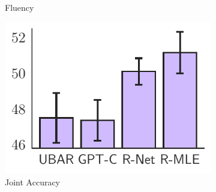 \begin{figure}[tb]
\begin{minipage}{0.49\textwidth}
\begin{subfigure}[b]{0.48\textwidth}
         \vspace{-6mm}
         \caption{Fluency}
         \label{fig:fluency}
     \end{subfigure}
     \vspace{-3mm}
     \captionsetup{font=small}
        \caption{ 
        \footnotesize{Bar plots for the results of human evaluation on appropriateness and fluency, showing the mean and one standard deviation of each method. 
        The scores are on a $5$ scale and higher scores indicate better results.
        ``GPT-C" denotes GPT-Critic.
        Details for the setup of human evaluation are discussed in .}
        }
        \label{fig:human_eval}
    \end{minipage}
    \hfill
    \begin{minipage}{0.49\textwidth}
        \centering
     \begin{subfigure}[b]{0.48\textwidth}
         \centering
         \includegraphics[width=\textwidth]{./Tex/fig/joint_acc_bar.pdf}
         \captionsetup{font=small}
         \vspace{-6mm}
         \caption{Joint Accuracy}
         \label{fig:dst_joint_acc}
     \end{subfigure}
     \hfill
     \begin{subfigure}[b]{0.48\textwidth}
         \centering

\end{subfigure}
\end{minipage}
\end{figure}
